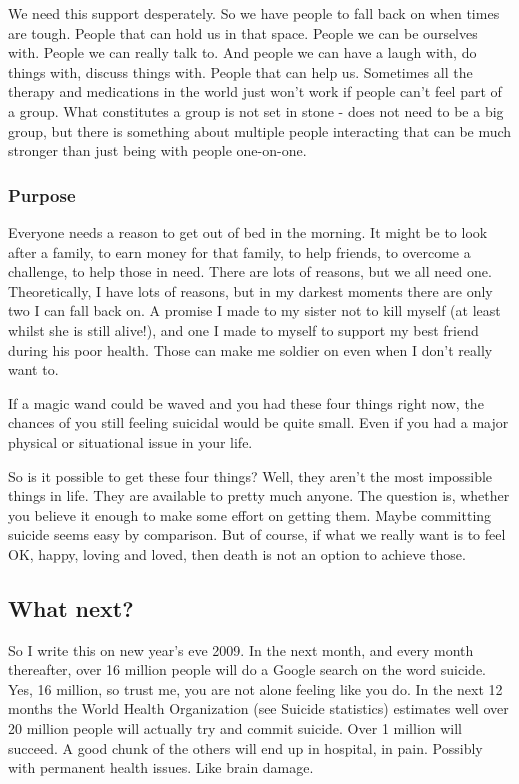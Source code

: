 \documentclass[12pt]{article}
\begin{document}
We need this support desperately. So we have people to fall back on when times are tough. People that can hold us in that space. People we can be ourselves with. People we can really talk to. And people we can have a laugh with, do things with, discuss things with. People that can help us. Sometimes all the therapy and medications in the world just won't work if people can't feel part of a group. What constitutes a group is not set in stone - does not need to be a big group, but there is something about multiple people interacting that can be much stronger than just being with people one-on-one.

\subsubsection{Purpose} Everyone needs a reason to get out of bed in the morning. It might be to look after a family, to earn money for that family, to help friends, to overcome a challenge, to help those in need. There are lots of reasons, but we all need one. Theoretically, I have lots of reasons, but in my darkest moments there are only two I can fall back on. A promise I made to my sister not to kill myself (at least whilst she is still alive!), and one I made to myself to support my best friend during his poor health. Those can make me soldier on even when I don't really want to.    

If a magic wand could be waved and you had these four things right now, the chances of you still feeling suicidal would be quite small. Even if you had a major physical or situational issue in your life.

So is it possible to get these four things? Well, they aren't the most impossible things in life. They are available to pretty much anyone. The question is, whether you believe it enough to make some effort on getting them. Maybe committing suicide seems easy by comparison. But of course, if what we really want is to feel OK, happy, loving and loved, then death is not an option to achieve those.

\subsection{What next?}

So I write this on new year's eve 2009. In the next month, and every month thereafter, over 16 million people will do a Google search on the word suicide. Yes, 16 million, so trust me, you are not alone feeling like you do. In the next 12 months the World Health Organization (see Suicide statistics) estimates well over 20 million people will actually try and commit suicide. Over 1 million will succeed. A good chunk of the others will end up in hospital, in pain. Possibly with permanent health issues. Like brain damage.
\end{document}
